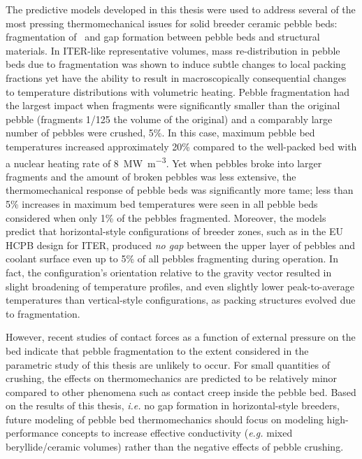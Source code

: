 {The predictive models developed in this thesis were used to address several of the most pressing thermomechanical issues for solid breeder ceramic pebble beds: fragmentation of \lit~and gap formation between pebble beds and structural materials. In ITER-like representative volumes, mass re-distribution in pebble beds due to fragmentation was shown to induce subtle changes to local packing fractions yet have the ability to result in macroscopically consequential changes to temperature distributions with volumetric heating. Pebble fragmentation had the largest impact when fragments were significantly smaller than the original pebble (fragments 1/125 the volume of the original) and a comparably large number of pebbles were crushed, 5\%. In this case, maximum pebble bed temperatures increased approximately 20\% compared to the well-packed bed with a nuclear heating rate of \SI{8}{\mega\watt\per\cubic\meter}. Yet when pebbles broke into larger fragments and the amount of broken pebbles was less extensive, the thermomechanical response of pebble beds was significantly more tame; less than 5\% increases in maximum bed temperatures were seen in all pebble beds considered when only 1\% of the pebbles fragmented. Moreover, the models predict that horizontal-style configurations of breeder zones, such as in the EU HCPB design for ITER, produced \textit{no gap} between the upper layer of pebbles and coolant surface even up to 5\% of all pebbles fragmenting during operation. In fact, the configuration’s orientation relative to the gravity vector resulted in slight broadening of temperature profiles, and even slightly lower peak-to-average temperatures than vertical-style configurations, as packing structures evolved due to fragmentation. 

However, recent studies of contact forces as a function of external pressure on the bed indicate that pebble fragmentation to the extent considered in the parametric study of this thesis are unlikely to occur. For small quantities of crushing, the effects on thermomechanics are predicted to be relatively minor compared to other phenomena such as contact creep inside the pebble bed. Based on the results of this thesis, \textit{i.e.} no gap formation in horizontal-style breeders, future modeling of pebble bed thermomechanics should focus on modeling high-performance concepts to increase effective conductivity (\textit{e.g.} mixed beryllide/ceramic volumes) rather than the negative effects of pebble crushing.

}
